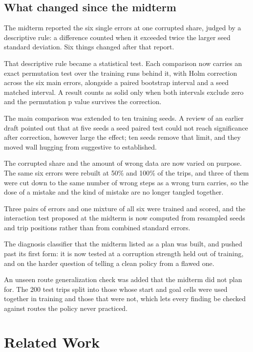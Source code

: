 \documentclass[conference]{IEEEtran}
\begin{document}
\subsection{What changed since the midterm}
The midterm reported the six single errors at one corrupted share, judged by a descriptive rule: a difference
counted when it exceeded twice the larger seed standard deviation. Six things changed after that report.

That descriptive rule became a statistical test. Each comparison now carries an exact permutation test over the
training runs behind it, with Holm correction across the six main errors, alongside a paired bootstrap
interval and a seed matched interval. A result counts as solid only when both intervals exclude zero and the
permutation p value survives the correction.

The main comparison was extended to ten training seeds. A review of an earlier draft pointed out that at five
seeds a seed paired test could not reach significance after correction, however large the effect; ten seeds
remove that limit, and they moved wall hugging from suggestive to established.

The corrupted share and the amount of wrong data are now varied on purpose. The same six errors were rebuilt at
50\% and 100\% of the trips, and three of them were cut down to the same number of wrong steps as a wrong turn
carries, so the dose of a mistake and the kind of mistake are no longer tangled together.

Three pairs of errors and one mixture of all six were trained and scored, and the interaction test proposed at the
midterm is now computed from resampled seeds and trip positions rather than from combined standard errors.

The diagnosis classifier that the midterm listed as a plan was built, and pushed past its first form: it is now
tested at a corruption strength held out of training, and on the harder question of telling a clean policy from a
flawed one.

An unseen route generalization check was added that the midterm did not plan for. The 200 test trips split into those whose
start and goal cells were used together in training and those that were not, which lets every finding be checked
against routes the policy never practiced.

\section{Related Work}
\end{document}
